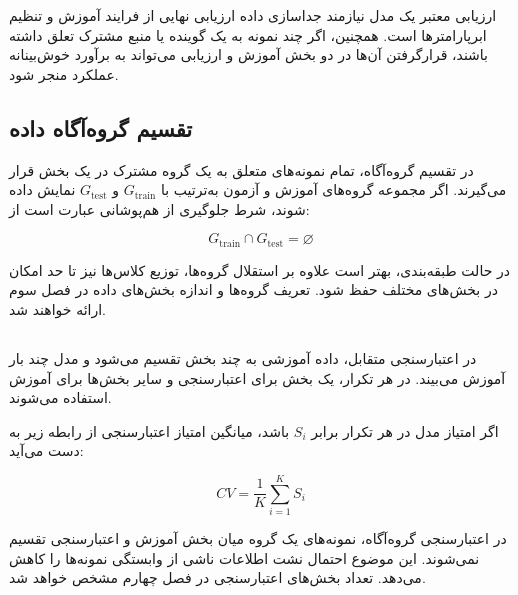 ارزیابی معتبر یک مدل نیازمند جداسازی داده ارزیابی نهایی از فرایند آموزش و تنظیم ابرپارامترها است. همچنین، اگر چند نمونه به یک گوینده یا منبع مشترک تعلق داشته باشند، قرارگرفتن آن‌ها در دو بخش آموزش و ارزیابی می‌تواند به برآورد خوش‌بینانه عملکرد منجر شود.


\subsection{تقسیم گروه‌آگاه داده}

در تقسیم گروه‌آگاه، تمام نمونه‌های متعلق به یک گروه مشترک در یک بخش قرار می‌گیرند. اگر مجموعه گروه‌های آموزش و آزمون به‌ترتیب با $G_{\mathrm{train}}$ و $G_{\mathrm{test}}$ نمایش داده شوند، شرط جلوگیری از هم‌پوشانی عبارت است از:

\begin{equation}
G_{\mathrm{train}}
\cap
G_{\mathrm{test}}
=
\varnothing
\end{equation}

در حالت طبقه‌بندی، بهتر است علاوه بر استقلال گروه‌ها، توزیع کلاس‌ها نیز تا حد امکان در بخش‌های مختلف حفظ شود. تعریف گروه‌ها و اندازه بخش‌های داده در فصل سوم ارائه خواهند شد.


\subsection{}

در اعتبارسنجی متقابل، داده آموزشی به چند بخش تقسیم می‌شود و مدل چند بار آموزش می‌بیند. در هر تکرار، یک بخش برای اعتبارسنجی و سایر بخش‌ها برای آموزش استفاده می‌شوند.

اگر امتیاز مدل در هر تکرار برابر $S_i$ باشد، میانگین امتیاز اعتبارسنجی از رابطه زیر به دست می‌آید:

\begin{equation}
CV
=
\frac{1}{K}
\sum_{i=1}^{K}S_i
\end{equation}

در اعتبارسنجی گروه‌آگاه، نمونه‌های یک گروه میان بخش آموزش و اعتبارسنجی تقسیم نمی‌شوند. این موضوع احتمال نشت اطلاعات ناشی از وابستگی نمونه‌ها را کاهش می‌دهد. تعداد بخش‌های اعتبارسنجی در فصل چهارم مشخص خواهد شد.


\subsection{}

